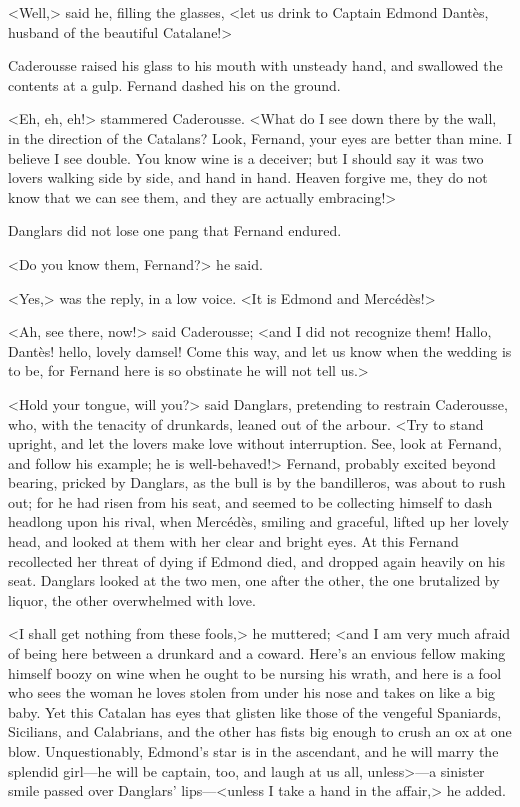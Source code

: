  <Well,> said he, filling the glasses, <let us drink to Captain Edmond Dantès, husband of the beautiful Catalane!> 

 Caderousse raised his glass to his mouth with unsteady hand, and swallowed the contents at a gulp. Fernand dashed his on the ground. 

 <Eh, eh, eh!> stammered Caderousse. <What do I see down there by the wall, in the direction of the Catalans? Look, Fernand, your eyes are better than mine. I believe I see double. You know wine is a deceiver; but I should say it was two lovers walking side by side, and hand in hand. Heaven forgive me, they do not know that we can see them, and they are actually embracing!> 

 Danglars did not lose one pang that Fernand endured. 

 <Do you know them, Fernand?> he said. 

 <Yes,> was the reply, in a low voice. <It is Edmond and Mercédès!> 

 <Ah, see there, now!> said Caderousse; <and I did not recognize them! Hallo, Dantès! hello, lovely damsel! Come this way, and let us know when the wedding is to be, for Fernand here is so obstinate he will not tell us.> 

 <Hold your tongue, will you?> said Danglars, pretending to restrain Caderousse, who, with the tenacity of drunkards, leaned out of the arbour. <Try to stand upright, and let the lovers make love without interruption. See, look at Fernand, and follow his example; he is well-behaved!>  Fernand, probably excited beyond bearing, pricked by Danglars, as the bull is by the bandilleros, was about to rush out; for he had risen from his seat, and seemed to be collecting himself to dash headlong upon his rival, when Mercédès, smiling and graceful, lifted up her lovely head, and looked at them with her clear and bright eyes. At this Fernand recollected her threat of dying if Edmond died, and dropped again heavily on his seat. Danglars looked at the two men, one after the other, the one brutalized by liquor, the other overwhelmed with love. 

 <I shall get nothing from these fools,> he muttered; <and I am very much afraid of being here between a drunkard and a coward. Here's an envious fellow making himself boozy on wine when he ought to be nursing his wrath, and here is a fool who sees the woman he loves stolen from under his nose and takes on like a big baby. Yet this Catalan has eyes that glisten like those of the vengeful Spaniards, Sicilians, and Calabrians, and the other has fists big enough to crush an ox at one blow. Unquestionably, Edmond's star is in the ascendant, and he will marry the splendid girl—he will be captain, too, and laugh at us all, unless>—a sinister smile passed over Danglars' lips—<unless I take a hand in the affair,> he added. 


